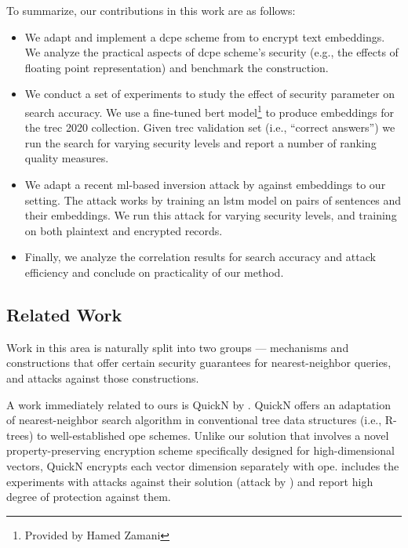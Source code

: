 		To summarize, our contributions in this work are as follows:
		\begin{itemize}
			\item
				We adapt and implement a \acrfull{dcpe} scheme from \cite{dcpe} to encrypt text embeddings.
				We analyze the practical aspects of \acrshort{dcpe} scheme's security (e.g., the effects of floating point representation) and benchmark the construction.

			\item
				We conduct a set of experiments to study the effect of security parameter on search accuracy.
				We use a fine-tuned \acrshort{bert} model\footnote{Provided by Hamed Zamani} to produce embeddings for the \acrshort{trec} 2020 collection.
				Given \acrshort{trec} validation set (i.e., ``correct answers'') we run the search for varying security levels and report a number of ranking quality measures.

			\item
				We adapt a recent \acrshort{ml}-based inversion attack by \textcite{embedding-attacks} against embeddings to our setting.
				The attack works by training an \acrshort{lstm} model on pairs of sentences and their embeddings.
				We run this attack for varying security levels, and training on both plaintext and encrypted records.

			\item
				Finally, we analyze the correlation results for search accuracy and attack efficiency and conclude on practicality of our method.
		\end{itemize}

		\subsection{Related Work}

			Work in this area is naturally split into two groups --- mechanisms and constructions that offer certain security guarantees for nearest-neighbor queries, and attacks against those constructions.

			A work immediately related to ours is QuickN by \textcite{quick-n}.
			QuickN offers an adaptation of nearest-neighbor search algorithm in conventional tree data structures (i.e., R-trees) to well-established \acrfull{ope} schemes.
			Unlike our solution that involves a novel property-preserving encryption scheme specifically designed for high-dimensional vectors, QuickN encrypts each vector dimension separately with \acrshort{ope}.
			\cite{quick-n} includes the experiments with attacks against their solution (attack by \textcite{leakage-abuse-grubs-2017}) and report high degree of protection against them.

